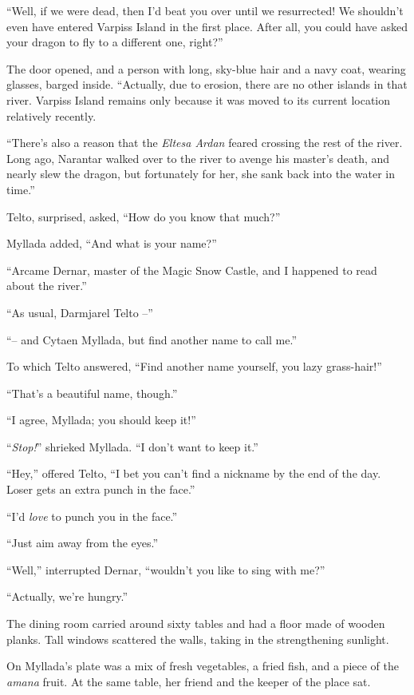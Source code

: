 ``Well, if we were dead, then I'd beat you over until we resurrected! We shouldn't even have entered Varpiss Island in the first place. After all, you could have asked your dragon to fly to a different one, right?''

The door opened, and a person with long, sky-blue hair and a navy coat, wearing glasses, barged inside. ``Actually, due to erosion, there are no other islands in that river. Varpiss Island remains only because it was moved to its current location relatively recently.

``There's also a reason that the \emph{Eltesa Ardan} feared crossing the rest of the river. Long ago, Narantar walked over to the river to avenge his master's death, and nearly slew the dragon, but fortunately for her, she sank back into the water in time.''

Telto, surprised, asked, ``How do you know that much?''

Myllada added, ``And what is your name?''

``Arcame Dernar, master of the Magic Snow Castle, and I happened to read about the river.''

``As usual, Darmjarel Telto --''

``-- and Cytaen Myllada, but find another name to call me.''

To which Telto answered, ``Find another name yourself, you lazy grass-hair!''

``That's a beautiful name, though.''

``I agree, Myllada; you should keep it!''

``\emph{Stop!}'' shrieked Myllada. ``I don't want to keep it.''

``Hey,'' offered Telto, ``I bet you can't find a nickname by the end of the day. Loser gets an extra punch in the face.''

``I'd \emph{love} to punch you in the face.''

``Just aim away from the eyes.''

``Well,'' interrupted Dernar, ``wouldn't you like to sing with me?''

``Actually, we're hungry.''

\centeredstars

The dining room carried around sixty tables and had a floor made of wooden planks. Tall windows scattered the walls, taking in the strengthening sunlight.

On Myllada's plate was a mix of fresh vegetables, a fried fish, and a piece of the \emph{amana} fruit. At the same table, her friend and the keeper of the place sat.

